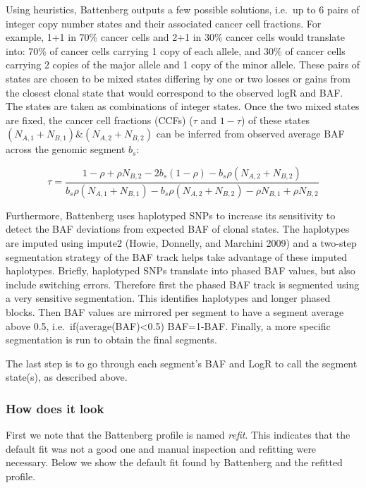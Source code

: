\documentclass[]{article}
\begin{document}
Using heuristics, Battenberg outputs a few possible solutions, i.e.~up
to 6 pairs of integer copy number states and their associated cancer
cell fractions. For example, 1+1 in 70\% cancer cells and 2+1 in 30\%
cancer cells would translate into: 70\% of cancer cells carrying 1 copy
of each allele, and 30\% of cancer cells carrying 2 copies of the major
allele and 1 copy of the minor allele. These pairs of states are chosen
to be mixed states differing by one or two losses or gains from the
closest clonal state that would correspond to the observed logR and BAF.
The states are taken as combinations of integer states. Once the two
mixed states are fixed, the cancer cell fractions (CCFs) (\(\tau\) and
\(1-\tau\)) of these states \((N_{A,1}+N_{B,1}) \& (N_{A,2}+N_{B,2})\)
can be inferred from observed average BAF across the genomic segment
\(b_s\):

\[ \tau=\frac{1-\rho+\rho
  N_{B,2}-2b_s(1-\rho)-b_s\rho(N_{A,2}+N_{B,2})}{b_s\rho(N_{A,1}+N_{B,1})-b_s\rho(N_{A,2}+N_{B,2})-\rho
  N_{B,1}+\rho N_{B,2}}\]

Furthermore, Battenberg uses haplotyped SNPs to increase its sensitivity
to detect the BAF deviations from expected BAF of clonal states. The
haplotypes are imputed using impute2 (Howie, Donnelly, and Marchini
2009) and a two-step segmentation strategy of the BAF track helps take
advantage of these imputed haplotypes. Briefly, haplotyped SNPs
translate into phased BAF values, but also include switching errors.
Therefore first the phased BAF track is segmented using a very sensitive
segmentation. This identifies haplotypes and longer phased blocks. Then
BAF values are mirrored per segment to have a segment average above 0.5,
i.e.~if(average(BAF)\textless{}0.5) BAF=1-BAF. Finally, a more specific
segmentation is run to obtain the final segments.

The last step is to go through each segment's BAF and LogR to call the
segment state(s), as described above.

\hypertarget{how-does-it-look}{%
\subsubsection{How does it look}\label{how-does-it-look}}

First we note that the Battenberg profile is named \emph{refit}. This
indicates that the default fit was not a good one and manual inspection
and refitting were necessary. Below we show the default fit found by
Battenberg and the refitted profile.
\end{document}
